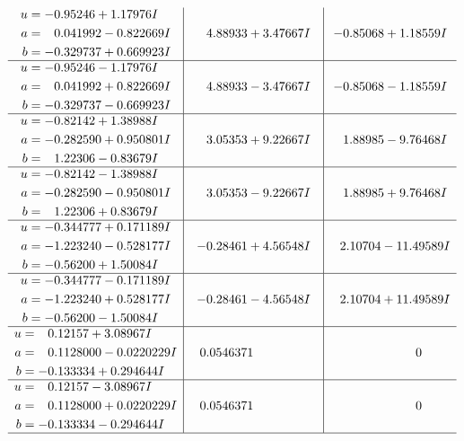 \documentclass[1p]{elsarticle_modified}
\theoremstyle{definition}
\begin{document}
$$\begin{array}{c|c|c}
\begin{aligned}
u &= -0.95246 + 1.17976 I \\
a &= \phantom{-}0.041992 - 0.822669 I \\
b &= -0.329737 + 0.669923 I\end{aligned}
 & \phantom{-}4.88933 + 3.47667 I & -0.85068 + 1.18559 I \\ \hline\begin{aligned}
u &= -0.95246 - 1.17976 I \\
a &= \phantom{-}0.041992 + 0.822669 I \\
b &= -0.329737 - 0.669923 I\end{aligned}
 & \phantom{-}4.88933 - 3.47667 I & -0.85068 - 1.18559 I \\ \hline\begin{aligned}
u &= -0.82142 + 1.38988 I \\
a &= -0.282590 + 0.950801 I \\
b &= \phantom{-}1.22306 - 0.83679 I\end{aligned}
 & \phantom{-}3.05353 + 9.22667 I & \phantom{-}1.88985 - 9.76468 I \\ \hline\begin{aligned}
u &= -0.82142 - 1.38988 I \\
a &= -0.282590 - 0.950801 I \\
b &= \phantom{-}1.22306 + 0.83679 I\end{aligned}
 & \phantom{-}3.05353 - 9.22667 I & \phantom{-}1.88985 + 9.76468 I \\ \hline\begin{aligned}
u &= -0.344777 + 0.171189 I \\
a &= -1.223240 - 0.528177 I \\
b &= -0.56200 + 1.50084 I\end{aligned}
 & -0.28461 + 4.56548 I & \phantom{-}2.10704 - 11.49589 I \\ \hline\begin{aligned}
u &= -0.344777 - 0.171189 I \\
a &= -1.223240 + 0.528177 I \\
b &= -0.56200 - 1.50084 I\end{aligned}
 & -0.28461 - 4.56548 I & \phantom{-}2.10704 + 11.49589 I \\ \hline\begin{aligned}
u &= \phantom{-}0.12157 + 3.08967 I \\
a &= \phantom{-}0.1128000 - 0.0220229 I \\
b &= -0.133334 + 0.294644 I\end{aligned}
 & \phantom{-}0.0546371\phantom{ +0.000000I} & \phantom{-0.000000 } 0 \\ \hline\begin{aligned}
u &= \phantom{-}0.12157 - 3.08967 I \\
a &= \phantom{-}0.1128000 + 0.0220229 I \\
b &= -0.133334 - 0.294644 I\end{aligned}
 & \phantom{-}0.0546371\phantom{ +0.000000I} & \phantom{-0.000000 } 0\\
 \hline 
 \end{array}$$\newpage\newpage\renewcommand{\arraystretch}{1}
\end{document}
